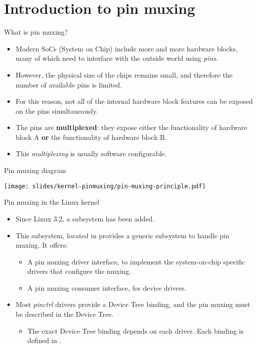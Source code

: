 \section{Introduction to pin muxing}

\begin{frame}{What is pin muxing?}
  \begin{itemize}
  \item Modern SoCs (System on Chip) include more and more hardware
    blocks, many of which need to interface with the outside world
    using {\em pins}.
  \item However, the physical size of the chips remains small, and
    therefore the number of available pins is limited.
  \item For this reason, not all of the internal hardware block
    features can be exposed on the pins simultaneously.
  \item The pins are {\bf multiplexed}: they expose either the
    functionality of hardware block A {\bf or} the functionality of
    hardware block B.
  \item This {\em multiplexing} is usually software configurable.
  \end{itemize}
\end{frame}

\begin{frame}{Pin muxing diagram}
  \begin{center}
    \texttt{[image: slides/kernel-pinmuxing/pin-muxing-principle.pdf]}
  \end{center}
\end{frame}

\begin{frame}{Pin muxing in the Linux kernel}
  \begin{itemize}
  \item Since Linux 3.2, a  subsystem has been added.
  \item This subsystem, located in  provides a
    generic subsystem to handle pin muxing. It offers:
    \begin{itemize}
    \item A pin muxing driver interface, to implement the system-on-chip
      specific drivers that configure the muxing.
    \item A pin muxing consumer interface, for device drivers.
    \end{itemize}
  \item Most {\em pinctrl} drivers provide a Device Tree binding, and
    the pin muxing must be described in the Device Tree.
    \begin{itemize}
    \item The exact Device Tree binding depends on each driver. Each
      binding is defined in .
    \end{itemize}
  \end{itemize}
\end{frame}

